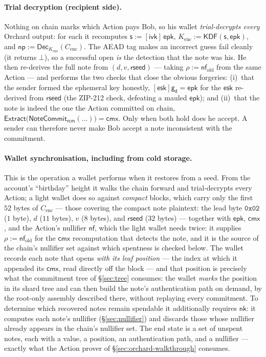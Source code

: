\documentclass[11pt,a4paper]{article}
\theoremstyle{definition}
\newcommand{\nfsym}{\mathsf{nf}}
\newcommand{\cmx}{\mathsf{cmx}}
\newcommand{\NoteCommit}{\ensuremath{\mathsf{NoteCommit}}}
\newcommand{\Extract}{\ensuremath{\mathsf{Extract}}}
\newcommand{\nksym}{\ensuremath{\mathsf{nk}}}
\newcommand{\ivk}{\ensuremath{\mathsf{ivk}}}
\newcommand{\gd}{\ensuremath{\mathsf{g_d}}}
\newcommand{\rcm}{\ensuremath{\mathsf{rcm}}}
\begin{document}
\paragraph{Trial decryption (recipient side).} Nothing on chain marks which
Action pays Bob, so his wallet \emph{trial-decrypts every} Orchard output: for
each it recomputes $\mathsf{s} := [\ivk]\,\mathsf{epk}$,
$K_{\mathrm{enc}} := \mathsf{KDF}(\mathsf{s}, \mathsf{epk})$, and
$\mathsf{np} := \mathsf{Dec}_{K_{\mathrm{enc}}}(C_{\mathrm{enc}})$. The AEAD tag
makes an incorrect guess fail cleanly (it returns $\bot$), so a successful open
\emph{is} the detection that the note was his. He then re-derives the full note
from $(d, v, \mathsf{rseed})$ --- taking $\rho := \nfsym_{\mathrm{old}}$ from the
same Action --- and performs the two checks that close the obvious forgeries:
(i)~that the sender formed the ephemeral key honestly, $[\mathsf{esk}]\gd = \mathsf{epk}$
for the $\mathsf{esk}$ re-derived from $\mathsf{rseed}$ (the ZIP-212 check,
defeating a mauled $\mathsf{epk}$); and (ii)~that the note is indeed the one
the Action committed on chain, $\Extract\big(\NoteCommit_{\rcm}(\ldots)\big) = \cmx$. Only
when both hold does he accept. A sender can therefore never make Bob accept a
note inconsistent with the commitment.

\paragraph{Wallet synchronisation, including from cold storage.} This is the
operation a wallet performs when it restores from a seed. From the account's
``birthday'' height it walks the chain forward and trial-decrypts every Action;
a light wallet does so against \emph{compact} blocks, which carry only the
first $52$ bytes of $C_{\mathrm{enc}}$ --- those covering the compact note
plaintext: the lead byte $\mathtt{0x02}$ ($1$ byte), $d$ ($11$ bytes), $v$
($8$ bytes), and $\mathsf{rseed}$ ($32$ bytes) --- together with
$\mathsf{epk}$, $\cmx$, and the Action's nullifier $\nfsym$, which the
light wallet needs twice: it supplies $\rho := \nfsym_{\mathrm{old}}$ for
the $\cmx$ recomputation that detects the note, and it is the source of
the chain's nullifier set against which spentness is checked below. The
wallet records each note that opens \emph{with its leaf
position} --- the index at which it appended its $\cmx$, read directly off the
block --- and that position is precisely what the commitment tree of
\S\ref{sec:tree} consumes: the wallet \emph{marks} the position in its shard
tree and can then build the note's authentication path on demand, by the
root-only assembly described there, without replaying every commitment. To
determine which recovered notes remain spendable it additionally requires
$\nksym$: it computes each note's nullifier (\S\ref{sec:nullifier}) and discards
those whose nullifier already appears in the chain's nullifier set. The end
state is a set of unspent notes, each with a value, a position, an
authentication path, and a nullifier --- exactly what the Action prover of
\S\ref{sec:orchard-walkthrough} consumes.
\end{document}

